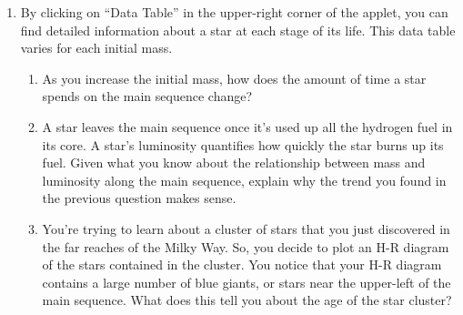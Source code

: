 \documentclass[11pt]{article}
\begin{document}
\begin{enumerate}
\begin{enumerate}
    \end{enumerate}
    
    \item By clicking on ``Data Table'' in the upper-right corner of the applet, you can find detailed information about a star at each stage of its life. This data table varies for each initial mass. 
    \begin{enumerate}
        \item As you increase the initial mass, how does the amount of time a star spends on the main sequence change?
        
        \item A star leaves the main sequence once it's used up all the hydrogen fuel in its core. A star's luminosity quantifies how quickly the star burns up its fuel. Given what you know about the relationship between mass and luminosity along the main sequence, explain why the trend you found in the previous question makes sense.
        
        \item You're trying to learn about a cluster of stars that you just discovered in the far reaches of the Milky Way. So, you decide to plot an H-R diagram of the stars contained in the cluster. You notice that your H-R diagram contains a large number of blue giants, or stars near the upper-left of the main sequence. What does this tell you about the age of the star cluster?
        
    \end{enumerate}
\end{enumerate}
\end{document}
